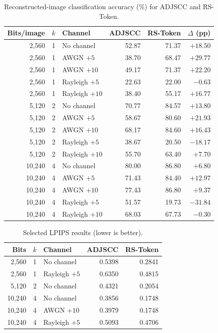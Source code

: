 \documentclass[letterpaper,journal]{IEEEtran}
\begin{document}
\begin{table}[!t]
\centering
\caption{Reconstructed-image classification accuracy (\%) for ADJSCC and RS-Token.}
\scriptsize
\begin{tabular}{@{}rrlrrr@{}}
\toprule
Bits/image & $k$ & Channel & ADJSCC & RS-Token & $\Delta$ (pp) \\ \midrule
2,560 & 1 & No channel & 52.87 & 71.37 & $+18.50$ \\
2,560 & 1 & AWGN $+5$ & 38.70 & 68.47 & $+29.77$ \\
2,560 & 1 & AWGN $+10$ & 49.17 & 71.37 & $+22.20$ \\
2,560 & 1 & Rayleigh $+5$ & 22.63 & 22.00 & $-0.63$ \\
2,560 & 1 & Rayleigh $+10$ & 38.40 & 55.17 & $+16.77$ \\
5,120 & 2 & No channel & 70.77 & 84.57 & $+13.80$ \\
5,120 & 2 & AWGN $+5$ & 58.67 & 80.60 & $+21.93$ \\
5,120 & 2 & AWGN $+10$ & 68.17 & 84.60 & $+16.43$ \\
5,120 & 2 & Rayleigh $+5$ & 38.67 & 20.50 & $-18.17$ \\
5,120 & 2 & Rayleigh $+10$ & 55.70 & 63.40 & $+7.70$ \\
10,240 & 4 & No channel & 80.00 & 86.80 & $+6.80$ \\
10,240 & 4 & AWGN $+5$ & 71.43 & 84.40 & $+12.97$ \\
10,240 & 4 & AWGN $+10$ & 77.43 & 86.80 & $+9.37$ \\
10,240 & 4 & Rayleigh $+5$ & 51.57 & 19.73 & $-31.84$ \\
10,240 & 4 & Rayleigh $+10$ & 68.03 & 67.73 & $-0.30$ \\ \bottomrule
\end{tabular}
\end{table}

\begin{table}[!t]
\centering
\caption{Selected LPIPS results (lower is better).}
\scriptsize
\begin{tabular}{@{}rrlrr@{}}
\toprule
Bits & $k$ & Channel & ADJSCC & RS-Token \\ \midrule
2,560 & 1 & No channel & 0.5398 & 0.2841 \\
2,560 & 1 & Rayleigh $+5$ & 0.6350 & 0.4815 \\
5,120 & 2 & No channel & 0.4321 & 0.2054 \\
10,240 & 4 & No channel & 0.3856 & 0.1748 \\
10,240 & 4 & AWGN $+10$ & 0.3979 & 0.1748 \\
10,240 & 4 & Rayleigh $+5$ & 0.5093 & 0.4706 \\ \bottomrule
\end{tabular}
\end{table}
\end{document}
